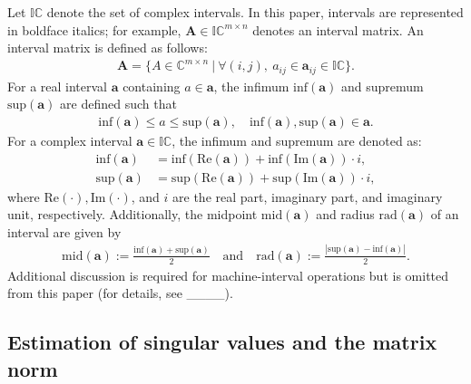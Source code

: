 Let $\mathbb{IC}$ denote the set of complex intervals. In this paper, intervals are represented in boldface italics; for example, $\bm{A} \in \mathbb{IC}^{m \times n}$ denotes an interval matrix. An interval matrix is defined as follows:
\begin{align}
    \bm{A}=\{A\in\mathbb{C}^{m\times n}\ |\ \forall (i, j),\  a_{ij}\in\bm{a}_{ij}\in\mathbb{IC}\}.
\end{align}
For a real interval $\bm{a}$ containing $a\in\bm a$, the infimum $\mathrm{inf}(\bm{a})$ and supremum $\mathrm{sup}(\bm{a})$ are defined such that
\begin{align}
    \mathrm{inf}(\bm{a})\leq  a\leq\mathrm{sup}(\bm{a}),\quad \mathrm{inf}(\bm{a}), \mathrm{sup}(\bm{a})\in \bm{a}.
\end{align}
For a complex interval $\bm{a} \in \mathbb{IC}$, the infimum and supremum are denoted as:
\begin{align}
    \mathrm{inf}(\bm{a})&=\mathrm{inf}(\mathrm{Re}(\bm{a}))+\mathrm{inf}(\mathrm{Im}(\bm{a}))\cdot i,\\ 
    \mathrm{sup}(\bm{a})&=\mathrm{sup}(\mathrm{Re}(\bm{a}))+\mathrm{sup}(\mathrm{Im}(\bm{a}))\cdot i,
\end{align}
where $\mathrm{Re}(\cdot), \mathrm{Im}(\cdot)$, and $i$ are the real part, imaginary part, and imaginary unit, respectively.
Additionally, the midpoint $\mathrm{mid}(\bm{a})$ and radius $\mathrm{rad}(\bm{a})$ of an interval are given by
\begin{align}
    \mathrm{mid}(\bm{a}):=\frac{\mathrm{inf}(\bm{a})+\mathrm{sup}(\bm{a})}{2}\quad\text{and}\quad \mathrm{rad}(\bm{a}):=\frac{|\mathrm{sup}(\bm{a})-\mathrm{inf}(\bm{a})|}{2}.
\end{align}
Additional discussion is required for machine-interval operations but is omitted from this paper (for details, see ____).

\subsection{Estimation of singular values and the matrix norm}

